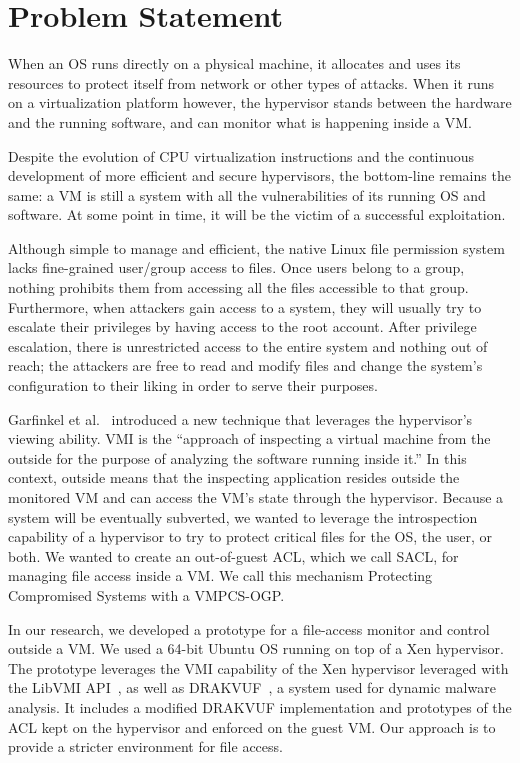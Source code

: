 \section{Problem Statement}\label{sec:problem} 
When an \ac{OS} runs directly on a physical machine, it allocates and uses its resources to protect itself from network or other types of attacks. When it runs on a virtualization platform however, the hypervisor stands between the hardware and the running software, and can monitor what is happening inside a \ac{VM}. 

\par Despite the evolution of \ac{CPU} virtualization instructions and the continuous development of more efficient and secure hypervisors, the bottom-line remains the same: a \ac{VM} is still a system with all the vulnerabilities of its running \ac{OS} and software. At some point in time, it will be the victim of a successful exploitation. 

\par Although simple to manage and efficient, the native Linux file permission system lacks fine-grained user/group access to files. Once users belong to a group, nothing prohibits them from accessing all the files accessible to that group. Furthermore, when attackers gain access to a system, they will usually try to escalate their privileges by having access to the root account. After privilege escalation, there is unrestricted access to the entire system and nothing out of reach; the attackers are free to read and modify files and change the system's configuration to their liking in order to serve their purposes.

\par Garfinkel et al.~\cite{garfinkel2003virtual} introduced a new technique that leverages the hypervisor's viewing ability. \ac{VMI} is the “approach of inspecting a virtual machine from the outside for the purpose of analyzing the software running inside it.” In this context, outside means that the inspecting application resides outside the monitored \ac{VM} and can access the \ac{VM}'s state through the hypervisor. Because a system will be eventually subverted, we wanted to leverage the introspection capability of a hypervisor to try to protect critical files for the OS, the user, or both. We wanted to create an out-of-guest \ac{ACL}, which we call \ac{SACL}, for managing file access inside a VM. We call this mechanism Protecting Compromised Systems with a \ac{VMPCS-OGP}.

\par In our research, we developed a prototype for a file-access monitor and control outside a \ac{VM}. We used a 64-bit Ubuntu OS running on top of a Xen hypervisor. The prototype leverages the \ac{VMI} capability of the Xen hypervisor leveraged with the LibVMI \ac{API}~\cite{payne2011libvmi}, as well as DRAKVUF~\cite{lengyel2014drakvuf}, a system used for dynamic malware analysis. It includes a modified DRAKVUF implementation and prototypes of the \ac{ACL} kept on the hypervisor and enforced on the guest \ac{VM}. Our approach is to provide a stricter environment for file access.

